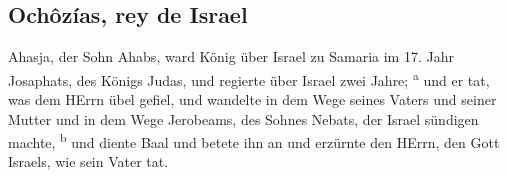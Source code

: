 \hypertarget{ochuxf4zuxedas-rey-de-israel}{%
\subsection{Ochôzías, rey de
Israel}\label{ochuxf4zuxedas-rey-de-israel}}

 Ahasja, der Sohn Ahabs, ward König über Israel zu
Samaria im 17. Jahr Josaphats, des Königs Judas, und regierte über
Israel zwei Jahre; \textsuperscript{a}  und er tat, was
dem HErrn übel gefiel, und wandelte in dem Wege seines Vaters und seiner
Mutter und in dem Wege Jerobeams, des Sohnes Nebats, der Israel sündigen
machte, \textsuperscript{b}  und diente Baal und betete
ihn an und erzürnte den HErrn, den Gott Israels, wie sein Vater tat.
